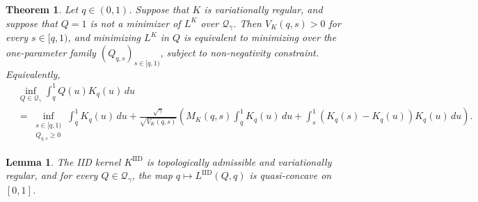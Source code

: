 \documentclass[10pt,a4paper]{amsart}
\newtheorem{theorem}{Theorem}
\newtheorem{lemma}{Lemma}
\newcommand{\IID}{\mathrm{IID}}
\newcommand{\Qgam}{\mathcal{Q}_{\comp}}
\newcommand{\ac}[1]{#1}
\newcommand{\comp}{\gamma}
\begin{document}
\begin{theorem}\label{thm:generic_variational_reduction}
Let $q \in (0,1)$. Suppose that $K$ is variationally regular, and suppose that $Q=1$ is not a minimizer of $L^K$ over $\Qgam$.  Then $V_K(q,s)>0$ for every $s\in[q,1)$, and minimizing $L^K$ in $Q$ is equivalent to minimizing over the one-parameter family $(Q_{q,s})_{s \in [q,1)}$, subject to non-negativity constraint.  Equivalently,
\begin{align*}\label{eq:generic_reduced_objective}
    &\inf_{Q\in\Qgam}\int_q^1  Q(u)K_q(u)\,du\\
    &=
    \inf_{\substack{
        s\in[q,1)\\
        Q_{q,s}\ge0
    }}
        \int_q^1K_q(u)\,du
        +
        \frac{\sqrt{\comp}}{\sqrt{V_K(q,s)}} \left(
        M_K(q,s)\int_q^1 K_q(u)\,du
        +
        \int_s^1(K_q(s)-K_q(u))K_q(u)\,du\right).
\end{align*}
\end{theorem}

\begin{lemma}\label{lem:iid_kernel_validity}
The \ac{IID} kernel $K^{\IID}$ is topologically admissible and variationally regular, and for every $Q\in\Qgam$, the map $q\mapsto L^{\IID}(Q,q)$ is quasi-concave on $[0,1]$.
\end{lemma}
\end{document}
